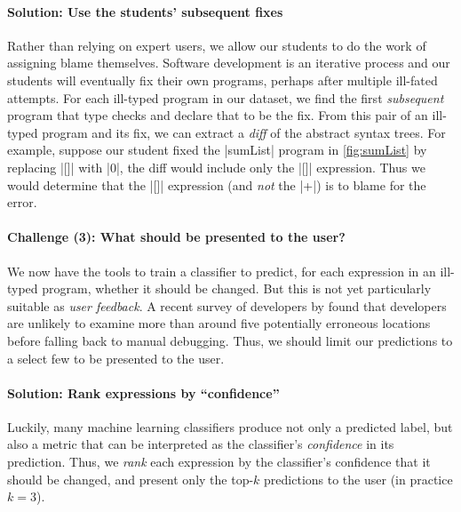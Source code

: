 \paragraph{\textbf{Solution: Use the students' subsequent fixes}}
%
Rather than relying on expert users, we allow our students to do the
work of assigning blame themselves.
%
Software development is an iterative process and our students will
eventually fix their own programs, perhaps after multiple ill-fated
attempts.
%
For each ill-typed program in our dataset, we find the first
\emph{subsequent} program that type checks and declare that to be the
fix.
%
From this pair of an ill-typed program and its fix, we can extract a
\emph{diff} of the abstract syntax trees.
%
For example, suppose our student fixed the |sumList| program in
\autoref{fig:sumList} by replacing |[]| with |0|, the diff would include
only the |[]| expression.
%
Thus we would determine that the |[]| expression (and \emph{not} the
|+|) is to blame for the error.


\paragraph{\textbf{Challenge (3): What should be presented to the user?}}
We now have the tools to train a classifier to predict, for each
expression in an ill-typed program, whether it should be changed.
%
But this is not yet particularly suitable as \emph{user feedback}.
%
A recent survey of developers by \citet{Kochhar2016-oc} found that
developers are unlikely to examine more than around five potentially
erroneous locations before falling back to manual debugging.
%
Thus, we should limit our predictions to a select few to be presented to
the user.

\paragraph{\textbf{Solution: Rank expressions by ``confidence''}}
Luckily, many machine learning classifiers produce not only a predicted
label, but also a metric that can be interpreted as the classifier's
\emph{confidence} in its prediction.
%
Thus, we \emph{rank} each expression by the classifier's confidence that
it should be changed, and present only the top-$k$ predictions to the
user (in practice $k=3$).



